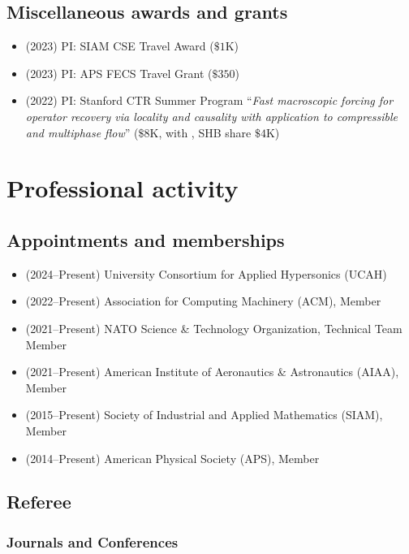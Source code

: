 \subsection{Miscellaneous awards and grants}

\begin{itemize}
    \item (2023) PI: SIAM CSE Travel Award ($\$1$K)
    \item (2023) PI: APS FECS Travel Grant ($\$350$)
    \item (2022) PI: Stanford CTR Summer Program ``\textit{Fast macroscopic forcing for operator recovery via locality and causality with application to compressible and multiphase flow}'' ($\$8$K, with \Florian, SHB share $\$4$K)
\end{itemize}

% 

\section{Professional activity}

\subsection{Appointments and memberships}

\begin{itemize}
    \item (2024--Present) University Consortium for Applied Hypersonics (UCAH)
    \item (2022--Present) Association for Computing Machinery (ACM), Member
    \item (2021--Present) NATO Science \& Technology Organization, Technical Team Member
    \item (2021--Present) American Institute of Aeronautics \& Astronautics (AIAA), Member
    \item (2015--Present) Society of Industrial and Applied Mathematics (SIAM), Member
    \item (2014--Present) American Physical Society (APS), Member
\end{itemize}

\subsection{Referee}

\subsubsection{Journals and Conferences}

